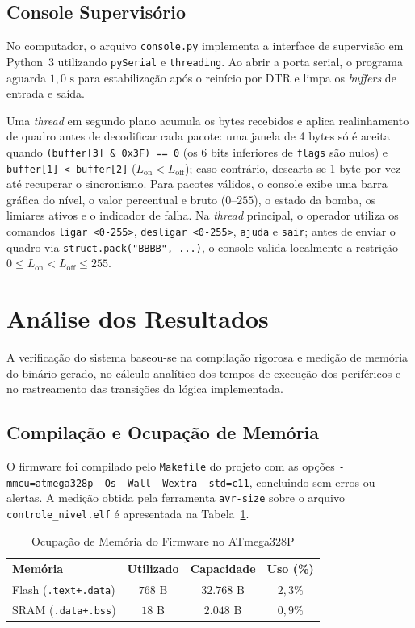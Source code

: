 \documentclass[conference]{IEEEtran}
\begin{document}
\subsection{Console Supervisório}
No computador, o arquivo \texttt{console.py} implementa a interface de supervisão em Python~3 utilizando \texttt{pySerial} \cite{pyserial_docs} e \texttt{threading}. Ao abrir a porta serial, o programa aguarda $1{,}0\text{ s}$ para estabilização após o reinício por DTR e limpa os \textit{buffers} de entrada e saída.

Uma \textit{thread} em segundo plano acumula os bytes recebidos e aplica realinhamento de quadro antes de decodificar cada pacote: uma janela de 4 bytes só é aceita quando \texttt{(buffer[3] \& 0x3F) == 0} (os 6 bits inferiores de \texttt{flags} são nulos) e \texttt{buffer[1] < buffer[2]} ($L_{\text{on}} < L_{\text{off}}$); caso contrário, descarta-se 1 byte por vez até recuperar o sincronismo. Para pacotes válidos, o console exibe uma barra gráfica do nível, o valor percentual e bruto ($0$--$255$), o estado da bomba, os limiares ativos e o indicador de falha. Na \textit{thread} principal, o operador utiliza os comandos \texttt{ligar <0-255>}, \texttt{desligar <0-255>}, \texttt{ajuda} e \texttt{sair}; antes de enviar o quadro via \texttt{struct.pack("BBBB", ...)}, o console valida localmente a restrição $0 \le L_{\text{on}} < L_{\text{off}} \le 255$.

\section{Análise dos Resultados}
A verificação do sistema baseou-se na compilação rigorosa e medição de memória do binário gerado, no cálculo analítico dos tempos de execução dos periféricos e no rastreamento das transições da lógica implementada.

\subsection{Compilação e Ocupação de Memória}
O firmware foi compilado pelo \texttt{Makefile} do projeto com as opções \texttt{-mmcu=atmega328p -Os -Wall -Wextra -std=c11}, concluindo sem erros ou alertas. A medição obtida pela ferramenta \texttt{avr-size} sobre o arquivo \texttt{controle\_nivel.elf} é apresentada na Tabela~\ref{tab:memoria}.

\begin{table}[htbp]
	\caption{Ocupação de Memória do Firmware no ATmega328P}
	\label{tab:memoria}
	\centering
	\footnotesize
	\setlength{\tabcolsep}{3.5pt}
	\begin{tabularx}{\columnwidth}{@{}Xccc@{}}
		\toprule
		\textbf{Memória}             & \textbf{Utilizado} & \textbf{Capacidade} & \textbf{Uso (\%)} \\
		\midrule
		Flash (\texttt{.text+.data}) & $768\text{ B}$     & $32{.}768\text{ B}$ & $2{,}3\%$         \\
		SRAM (\texttt{.data+.bss})   & $18\text{ B}$      & $2{.}048\text{ B}$  & $0{,}9\%$         \\
		\bottomrule
	\end{tabularx}
\end{table}
\end{document}
